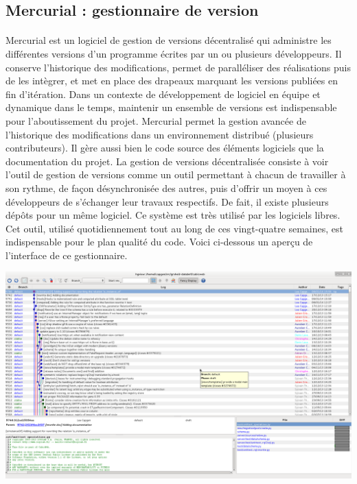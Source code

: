 \documentclass {report}
\begin{document}
\subsection{Mercurial : gestionnaire de version}
\paragraph{}
Mercurial est un logiciel de gestion de versions décentralisé qui administre les différentes versions d'un programme écrites par un ou plusieurs développeurs. Il conserve l’historique des modifications, permet de paralléliser des réalisations puis de les intègrer, et met en place des drapeaux marquant les versions publiées en fin d’itération. Dans un contexte de développement de logiciel en équipe et dynamique dans le temps, maintenir un ensemble de versions est indispensable pour l'aboutissement du projet. Mercurial permet la gestion avancée de l’historique des modifications dans un environnement distribué (plusieurs contributeurs). Il gère aussi bien le code source des éléments logiciels que la documentation du projet. La gestion de versions décentralisée consiste à voir l'outil de gestion de versions comme un outil permettant à chacun de travailler à son rythme, de façon désynchronisée des autres, puis d'offrir un moyen à ces développeurs de s'échanger leur travaux respectifs. De fait, il existe plusieurs dépôts pour un même logiciel. Ce système est très utilisé par les logiciels libres. Cet outil, utilisé quotidiennement tout au long de ces vingt-quatre semaines, est indispensable pour le plan qualité du code. Voici ci-dessous un aperçu de l'interface de ce gestionnaire.

\begin{center}
\includegraphics[scale=0.4]{mercurial.png}
\end{center}
\end{document}

